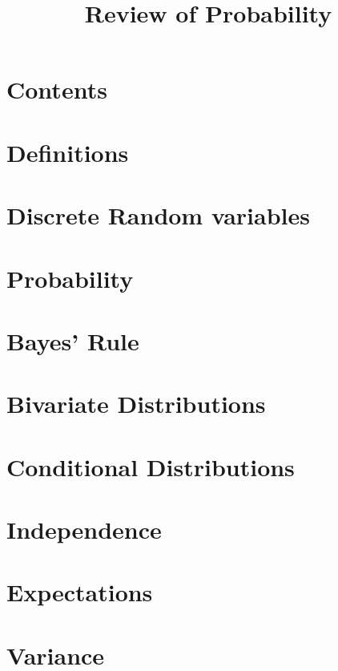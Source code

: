 \title[Probability]{Review of Probability}
\date{}





\section{Contents}

\section{Definitions}

\section{Discrete Random variables}

\section{Probability}

\section{Bayes' Rule}

\section{Bivariate Distributions}

\section{Conditional Distributions}

\section{Independence}

\section{Expectations}

\section{Variance}

